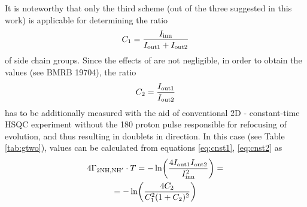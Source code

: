 \documentclass[twocolumn]{svjour3}           %
\begin{document}
It is noteworthy that only the third scheme (out of the three suggested 
in this work) is applicable for determining the ratio
\begin{equation}
    \label{eq:cnst1}
    C_1 = \frac{I_\textrm{inn}}{I_\textrm{out1} + I_\textrm{out2}}
\end{equation}
of side chain \NHtwo{} groups. Since the effects of \gtwoNNH{}
are not negligible, in order to obtain the \gtwoNH{} values 
(see BMRB 19704), the ratio
\begin{equation}
    \label{eq:cnst2}
    C_2 = \frac{I_\textrm{out1}}{I_\textrm{out2}}
\end{equation}
has to be additionally measured with the aid of conventional 2D 
\hlab-\nlab{} constant-time {HSQC} experiment without the 180\degree{} 
proton pulse responsible for refocusing of \oneJch{} evolution, 
and thus resulting in doublets in \nlab{} direction. In this case 
(see Table \ref{tab:gtwo}), \gtwoNH{} values can be calculated from equations \eqref{eq:cnst1}, \eqref{eq:cnst2} as
\begin{multline}
    \label{eq:gtwoNH2}
    4\Gamma_{\text{2NH,NH}'}\cdot T = 
    -\ln \biggl( \frac{4 I_\textrm{out1}I_\textrm{out2}}{I_\textrm{inn}^2} \biggr)= \\
    = -\ln \biggl( \frac{4 C_2}{C_1^2 (1+C_2)^2} \biggr)
\end{multline}
\end{document}
